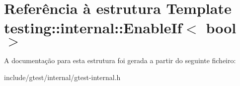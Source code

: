 \hypertarget{structtesting_1_1internal_1_1EnableIf}{\section{Referência à estrutura Template testing\-:\-:internal\-:\-:Enable\-If$<$ bool $>$}
\label{structtesting_1_1internal_1_1EnableIf}
}


A documentação para esta estrutura foi gerada a partir do seguinte ficheiro\-:\begin{DoxyCompactItemize}
\item 
include/gtest/internal/gtest-\/internal.\-h\end{DoxyCompactItemize}
